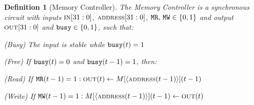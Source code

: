 \documentclass[12pt]{article}
\newcommand{\scr}[1]{{\scriptstyle\textup{#1}}}
\newcommand{\scrf}[1]{{\scriptstyle\textup{\footnotesize #1}}}
\newcommand*{\B}{\{0,1\}}
\newcommand{\repr}[1]{\langle{#1}\rangle}
\newtheorem{definition}[theorem]{Definition}
\begin{document}
\begin{definition}[Memory Controller]
  The Memory Controller is a synchronous circuit with inputs $\scrf{IN}[31:0]$, $\scr{ADDRESS}[31:0]$, ${\tt MR},\,{\tt MW}\in\B$ and output $\scrf{OUT}[31:0]$ and ${\tt busy}\in\B$, such that:
  \begin{compactitem}
    \item [(Busy)] The input is stable while ${\tt busy}(t)=1$
    \item [(Free)] If ${\tt busy}(t)=0$ and ${\tt busy}(t-1)=1$, then: 
    \begin{compactitem}
      \item[(Read)] If ${\tt MR}(t-1)=1: \scrf{OUT}(t)\gets M[\repr{\scr{ADDRESS}(t-1)}](t-1)$
      \item[(Write)] If ${\tt MW}(t-1)=1: M[\repr{\scr{ADDRESS}(t-1)}](t-1)\gets \scrf{OUT}(t)$
    \end{compactitem}
  \end{compactitem}
\end{definition}
\end{document}
